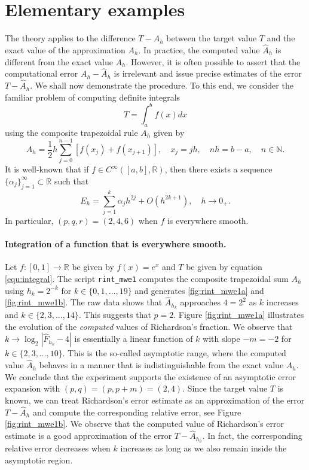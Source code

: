 \documentclass[runningheads]{llncs}
\begin{document}
\section{Elementary examples}

The theory applies to the difference $T - A_h$ between the target value $T$ and the exact value of the approximation $A_h$.
In practice, the computed value $\hat{A}_h$ is different from the exact value $A_h$. However, it is often possible to assert that the computational error $A_h - \hat{A}_h$ is irrelevant and issue precise estimates of the error $T - \hat{A}_h$. We shall now demonstrate the procedure. To this end, we consider the familiar problem of computing definite integrals
\begin{equation} \label{equ:integral}
  T = \int_{a}^b f(x) dx
\end{equation}
using the composite trapezoidal rule $A_h$ given by
\begin{equation}
  A_h = \frac{1}{2}h \sum_{j=0}^{n-1} \left[ f(x_j) + f(x_{j+1}) \right], \quad x_j = jh, \quad nh = b-a, \quad n \in \mathbb{N}.
\end{equation}
It is well-known that if $f \in C^{\infty}([a,b], \mathbb{R})$, then there exists a sequence $\{\alpha_j\}_{j=1}^\infty \subset \mathbb{R}$ such that 
\begin{equation} \label{equ:trapezoidal-rule:aex}
  E_h = \sum_{j=1}^k \alpha _j h^{2j} + O(h^{2k+1}), \quad h \rightarrow 0_+.
\end{equation}
In particular, $(p,q,r) = (2,4,6)$ when $f$ is everywhere smooth.
\paragraph{Integration of a function that is everywhere smooth.}

Let $f : [0, 1] \rightarrow \mathbb{R}$ be given by $f(x) = e^x$ and $T$ be given by equation \eqref{equ:integral}.
The script {\tt rint\_mwe1} computes the composite trapezoidal sum $A_h$ using $h_k = 2^{-k}$ for $k \in \{0,1,\dots,19\}$ and generates \ref{fig:rint_mwe1a} and \ref{fig:rint_mwe1b}.
The raw data shows that $\hat{A}_{h_k}$ approaches $4 = 2^2$ as $k$ increases and $k \in \{2,3,\dots,14\}$.
This suggests that $p=2$.
Figure \ref{fig:rint_mwe1a} illustrates the evolution of the \emph{computed} values of Richardson's fraction.
We observe that $k \rightarrow \log_2|\hat{F}_{h_k} - 4|$ is essentially a linear function of $k$ with slope $-m = -2$ for $k \in \{2,3,\dots,10\}$.
This is the so-called asymptotic range, where the computed value $\hat{A}_h$  behaves in a manner that is indistinguishable from the exact value $A_h$.
We conclude that the experiment supports the existence of an asymptotic error expansion with $(p,q) = (p,p+m) = (2,4)$.
Since the target value $T$ is known, we can treat Richardson's error estimate as an approximation of the error $T - \hat{A}_h$ and compute the corresponding relative error, see Figure \ref{fig:rint_mwe1b}.
We observe that the computed value of Richardson's error estimate is a good approximation of the error $T - \hat{A}_{h_h}$. In fact, the corresponding relative error decreases when $k$ increases as long as we also remain inside the asymptotic region.
\end{document}
